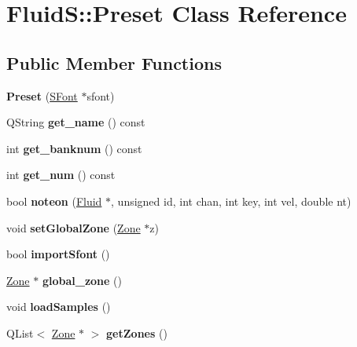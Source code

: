 \hypertarget{class_fluid_s_1_1_preset}{}\section{FluidS\+:\+:Preset Class Reference}
\label{class_fluid_s_1_1_preset}
\subsection*{Public Member Functions}
\begin{DoxyCompactItemize}
\item 
\mbox{\label{class_fluid_s_1_1_preset_a8f9d3c4c60be44db8ff11e47a138d77e}} 
{\bfseries Preset} (\hyperlink{class_fluid_s_1_1_s_font}{S\+Font} $\ast$sfont)
\item 
\mbox{\label{class_fluid_s_1_1_preset_a0be6d1f30b644945d8acb1730e6051e7}} 
Q\+String {\bfseries get\+\_\+name} () const
\item 
\mbox{\label{class_fluid_s_1_1_preset_a355facb3aca74097fb7d5c48717a7073}} 
int {\bfseries get\+\_\+banknum} () const
\item 
\mbox{\label{class_fluid_s_1_1_preset_ae9499e46104dbc846989d376d611d2d7}} 
int {\bfseries get\+\_\+num} () const
\item 
\mbox{\label{class_fluid_s_1_1_preset_a9d6d7b702e25d7e6499cc409751a89df}} 
bool {\bfseries noteon} (\hyperlink{class_fluid_s_1_1_fluid}{Fluid} $\ast$, unsigned id, int chan, int key, int vel, double nt)
\item 
\mbox{\label{class_fluid_s_1_1_preset_aaa44b4829f7449eb036688e24d50b160}} 
void {\bfseries set\+Global\+Zone} (\hyperlink{class_fluid_s_1_1_zone}{Zone} $\ast$z)
\item 
\mbox{\label{class_fluid_s_1_1_preset_a7de8cda3c37b55ff1915c2aafd680e3e}} 
bool {\bfseries import\+Sfont} ()
\item 
\mbox{\label{class_fluid_s_1_1_preset_a71c4addf799648c061b0574475fe41c6}} 
\hyperlink{class_fluid_s_1_1_zone}{Zone} $\ast$ {\bfseries global\+\_\+zone} ()
\item 
\mbox{\label{class_fluid_s_1_1_preset_a11f86e67993bf1fa9dbc1d93f2ff259c}} 
void {\bfseries load\+Samples} ()
\item 
\mbox{\label{class_fluid_s_1_1_preset_a199de12d0d159f3215c43bed037f3006}} 
Q\+List$<$ \hyperlink{class_fluid_s_1_1_zone}{Zone} $\ast$ $>$ {\bfseries get\+Zones} ()
\end{DoxyCompactItemize}
